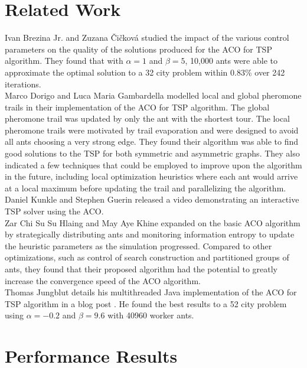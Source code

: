\documentclass[twocolumn]{article}
\begin{document}
\section{Related Work}

Ivan Brezina Jr. and Zuzana \v{C}i\v{c}kov\'{a} \cite{mis:aco} studied the 
impact of the various control parameters on the quality of the solutions 
produced for the ACO for TSP algorithm. They found that with $\alpha=1$ and 
$\beta=5$, 10,000 ants were able to approximate the optimal solution to a 32 city
problem within 0.83\% over 242 iterations. \\

Marco Dorigo and Luca Maria Gambardella \cite{iridia:aco} modelled local and 
global pheromone trails in their implementation of the ACO for TSP algorithm. 
The global pheromone trail was updated by only the ant with the shortest tour. 
The local pheromone trails were motivated by trail evaporation and were designed
to avoid all ants choosing a very strong edge. They found their algorithm was 
able to find good solutions to the TSP for both symmetric and asymmetric graphs.
They also indicated a few techniques that could be employed to improve upon the 
algorithm in the future, including local optimization heuristics where each ant 
would arrive at a local maximum before updating the trail and parallelizing the
algorithm. \\

Daniel Kunkle and Stephen Guerin released a video \cite{youtube:aco}
demonstrating an interactive TSP solver using the ACO. \\

Zar Chi Su Su Hlaing and May Aye Khine \cite{ipcsit:aco} expanded on the basic 
ACO algorithm by strategically distributing ants and monitoring information 
entropy to update the heuristic parameters as the simulation progressed. 
Compared to other optimizations, such as control of search construction and 
partitioned groups of ants, they found that their proposed algorithm had the 
potential to greatly increase the convergence speed of the ACO algorithm. \\

Thomas Jungblut details his multithreaded Java implementation of the ACO for TSP
algorithm in a blog post \cite{jungblut:aco}. He found the best results to a 52
city problem using $\alpha=-0.2$ and $\beta=9.6$ with 40960 worker ants.

\section{Performance Results}
\end{document}
